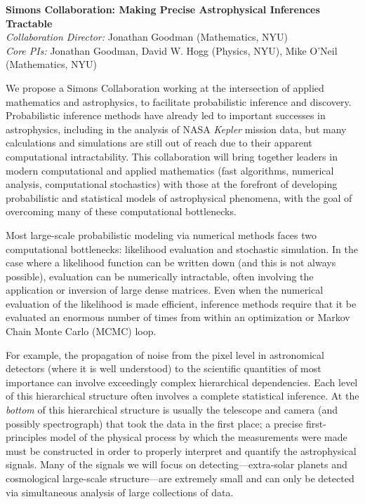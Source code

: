 \documentclass[12pt]{article}
\newcommand{\project}[1]{\textsl{#1}}
\begin{document}
\sloppy\sloppypar\thispagestyle{empty}

\begin{center}
\textbf{Simons Collaboration: Making Precise Astrophysical Inferences
Tractable}\\
\textit{Collaboration Director:} Jonathan Goodman (Mathematics, NYU)\\
\textit{Core PIs:} Jonathan Goodman, David W. Hogg (Physics, NYU), Mike O'Neil (Mathematics, NYU)
\end{center}
\smallskip

We propose a Simons Collaboration working at the intersection of applied
mathematics and astrophysics, to facilitate probabilistic inference 
and discovery.
Probabilistic inference methods have already led to important successes in
astrophysics, including in the analysis of NASA \project{Kepler} mission data,
but many calculations and simulations are still out of reach due to their 
apparent computational intractability.
This collaboration will bring together leaders in
modern computational and applied mathematics (fast algorithms, numerical
analysis, computational stochastics) with those at the forefront of
developing probabilistic and statistical models of astrophysical
phenomena, with the goal of overcoming many of these computational
bottlenecks.

Most large-scale probabilistic modeling via numerical
methods faces two computational bottlenecks: likelihood
evaluation and stochastic simulation.
In the case where a likelihood function can be written down
(and this is not always possible), evaluation can be numerically
intractable, often involving the application or inversion of
large dense matrices.
Even when the numerical evaluation of the likelihood is
made efficient, inference methods require that it be
evaluated an enormous number of times from within an optimization or
Markov Chain Monte Carlo (MCMC) loop.

For example, the propagation of noise from the pixel level in astronomical detectors
(where it is well understood) to the scientific quantities of most
importance can involve exceedingly complex hierarchical dependencies.
Each level of this hierarchical structure often involves a complete
statistical inference.
At the \emph{bottom} of this hierarchical structure is usually the
telescope and camera (and possibly spectrograph) that took the data in
the first place; a precise first-principles model of the physical
process by which the measurements were made must be constructed in order
to properly interpret and quantify the astrophysical signals.
Many of the signals we will focus on detecting---extra-solar planets and cosmological large-scale structure---are
extremely small and can only be detected via simultaneous
analysis of large collections of data.
\end{document}
